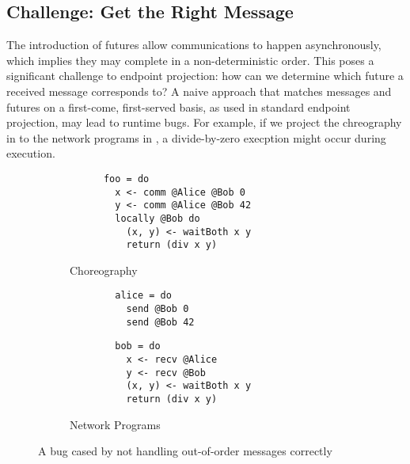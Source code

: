 \subsection{Challenge: Get the Right Message}

The introduction of futures allow communications to happen asynchronously, which implies they may complete in a non-deterministic order.
%
This poses a significant challenge to endpoint projection: how can we determine which future a received message corresponds to?
%
A naive approach that matches messages and futures on a first-come, first-served basis, as used in standard endpoint projection, may lead to runtime bugs.
%
For example, if we project the chreography in  to the network programs in , a divide-by-zero execption might occur during execution.

\begin{figure}[h]
  \begin{subfigure}[b]{.4\textwidth}
    \begin{verbatim}
      foo = do
        x <- comm @Alice @Bob 0
        y <- comm @Alice @Bob 42
        locally @Bob do
          (x, y) <- waitBoth x y
          return (div x y)
    \end{verbatim}
    \caption{Choreography}
    \label{fig:challenge-chor}
  \end{subfigure}
  \begin{subfigure}[b]{.5\textwidth}
    \begin{minipage}[t]{.4\textwidth}
      \begin{verbatim}
        alice = do
          send @Bob 0
          send @Bob 42
      \end{verbatim}      
    \end{minipage}
    \begin{minipage}[t]{.45\textwidth}
      \begin{verbatim}
        bob = do
          x <- recv @Alice
          y <- recv @Bob
          (x, y) <- waitBoth x y
          return (div x y)

      \end{verbatim}
    \end{minipage}
    \caption{Network Programs}
    \label{fig:challenge-net-bug}
  \end{subfigure}
  \caption{A bug cased by not handling out-of-order messages correctly}
\end{figure}

